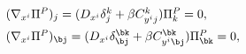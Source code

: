 \begin{equation}
\begin{array}{l}
(\nabla_{x^i}\Pi^P)_j=(D_{x^i}\delta^k_j+\beta C_{y^ij}^k)\Pi^P_k=0,
\\[0.2cm]
(\nabla_{x^i}\Pi^P)_{\bj}=(D_{x^i}\delta^{\bk}_{\bj}
+\beta C_{y^i \bj}^{\bk})\Pi^P_{\bk}=0,
\end{array}
\label{parallel}
\end{equation}

